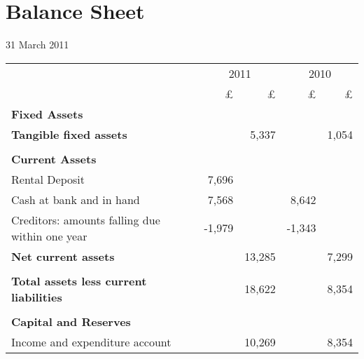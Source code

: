 \section{Balance Sheet}
31 March 2011

\begin{center}
\begin{tabular}{  l  r  r r r}
\toprule
                            & \multicolumn{2}{c}{2011} &  \multicolumn{2}{c}{2010} \\
\cmidrule(r){2-3} \cmidrule(r){4-5}
                                                & £     & £     & £     & £     \\
{\bf Fixed Assets}                              &       &       &       &       \\
{\bf Tangible fixed assets}                     &       & 5,337 &       & 1,054 \\
\cmidrule(r){2-3} \cmidrule(r){4-5} \\
{\bf Current Assets}                            &       &       &       &       \\
Rental Deposit                                  & 7,696 &       &       &       \\
Cash at bank and in hand                        & 7,568 &       & 8,642 &       \\
Creditors: amounts falling due within one year  & -1,979 &      & -1,343&      \\
{\bf Net current assets}                        &       & 13,285&       & 7,299 \\
\cmidrule(r){2-3} \cmidrule(r){4-5} \\
{\bf Total assets less current liabilities}     &       & 18,622&       & 8,354 \\
\cmidrule(r){2-3} \cmidrule(r){4-5}  \\
{\bf Capital and Reserves}&\\
Income and expenditure account                  &       & 10,269&       & 8,354 \\
\bottomrule
\end{tabular}

\end{center}

